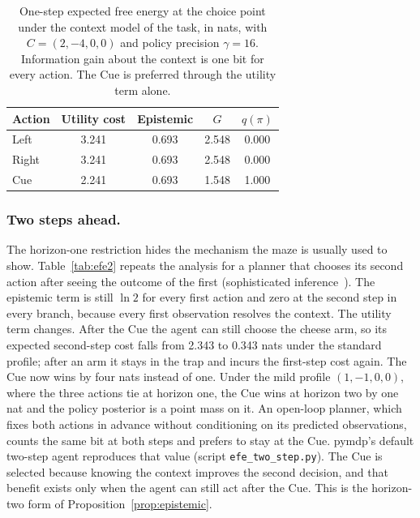 \documentclass[pdflatex,sn-apa]{sn-jnl}%
\theoremstyle{definition}
\begin{document}
\begin{table}[t]
\centering
{\small
\begin{tabular}{lcccc}
\hline
\textbf{Action} & \textbf{Utility cost} & \textbf{Epistemic} & $G$ & $q(\pi)$ \\
\hline
Left  & 3.241 & 0.693 & 2.548 & 0.000 \\
Right & 3.241 & 0.693 & 2.548 & 0.000 \\
Cue   & 2.241 & 0.693 & 1.548 & 1.000 \\
\hline
\end{tabular}
}
\caption{One-step expected free energy at the choice point under the context model of the task, in nats, with $C = (2,-4,0,0)$ and policy precision $\gamma = 16$. Information gain about the context is one bit for every action. The Cue is preferred through the utility term alone.}
\label{tab:efe}
\end{table}

\subsubsection{Two steps ahead.}\label{sec:twostep}
The horizon-one restriction hides the mechanism the maze is usually used to show. Table~\ref{tab:efe2} repeats the analysis for a planner that chooses its second action after seeing the outcome of the first (sophisticated inference~\citep{fristonSophisticatedInference2021}). The epistemic term is still $\ln 2$ for every first action and zero at the second step in every branch, because every first observation resolves the context. The utility term changes. After the Cue the agent can still choose the cheese arm, so its expected second-step cost falls from 2.343 to 0.343 nats under the standard profile; after an arm it stays in the trap and incurs the first-step cost again. The Cue now wins by four nats instead of one. Under the mild profile $(1,-1,0,0)$, where the three actions tie at horizon one, the Cue wins at horizon two by one nat and the policy posterior is a point mass on it. An open-loop planner, which fixes both actions in advance without conditioning on its predicted observations, counts the same bit at both steps and prefers to stay at the Cue. pymdp's default two-step agent reproduces that value (script \texttt{efe\_two\_step.py}). The Cue is selected because knowing the context improves the second decision, and that benefit exists only when the agent can still act after the Cue. This is the horizon-two form of Proposition~\ref{prop:epistemic}.
\end{document}
